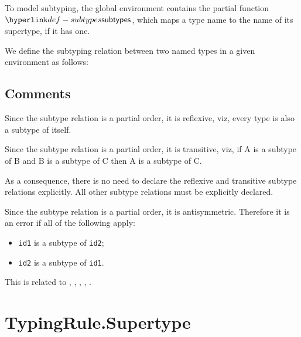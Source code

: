 \documentclass{book}
\newcommand\tty[0]{\texttt{ty}}
\begin{document}
To model subtyping, the global environment contains the partial function \\
$\subtypes$, which maps a type name to the name of its supertype, if it has
one.

We define the subtyping relation between two named types in a given environment as follows:

  \subsection{Comments}
  Since the subtype relation is a partial order, it is reflexive, viz,
  every type is also a subtype of itself.

  Since the subtype relation is a partial order, it is transitive, viz, if A is
  a subtype of B and B is a subtype of C then A is a subtype of C.

  As a consequence, there is no need to declare the reflexive and transitive
  subtype relations explicitly. All other subtype relations must be explicitly
  declared.

  Since the subtype relation is a partial order, it is antisymmetric. Therefore
  it is an error if all of the following apply:
  \begin{itemize}
  \item \texttt{id1} is a subtype of \texttt{id2};
  \item \texttt{id2} is a subtype of \texttt{id1}.
  \end{itemize}

  This is related to , , , , .

\section{TypingRule.Supertype}
\end{document}
